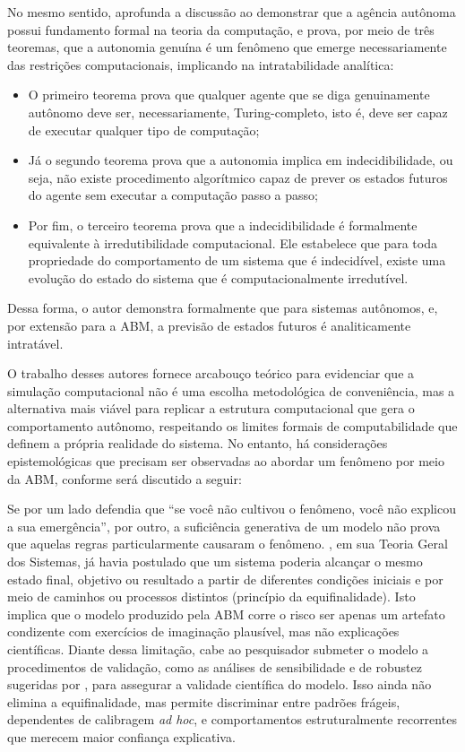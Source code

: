 \documentclass[12pt,oneside,a4paper,brazil,sumario=tradicional]{abntex2}
\begin{document}
No mesmo sentido,  aprofunda a discussão ao demonstrar que a agência autônoma possui fundamento formal na teoria da computação, e prova, por meio de três teoremas, que a autonomia genuína é um fenômeno que emerge necessariamente das restrições computacionais, implicando na intratabilidade analítica:

\begin{itemize}
  \item O primeiro teorema prova que qualquer agente que se diga genuinamente autônomo deve ser, necessariamente, Turing-completo, isto é, deve ser capaz de executar qualquer tipo de computação;
  \item Já o segundo teorema prova que a autonomia implica em indecidibilidade, ou seja, não existe procedimento algorítmico capaz de prever os estados futuros do agente sem executar a computação passo a passo;
  \item Por fim, o terceiro teorema prova que a indecidibilidade é formalmente equivalente à irredutibilidade computacional. Ele estabelece que para toda propriedade do comportamento de um sistema que é indecidível, existe uma evolução do estado do sistema que é computacionalmente irredutível.
\end{itemize}
Dessa forma, o autor demonstra formalmente que para sistemas autônomos, e, por extensão para a ABM, a previsão de estados futuros é analiticamente intratável.

O trabalho desses autores fornece arcabouço teórico para evidenciar que a simulação computacional não é uma escolha metodológica de conveniência, mas a alternativa mais viável para replicar a estrutura computacional que gera o comportamento autônomo, respeitando os limites formais de computabilidade que definem a própria realidade do sistema. No entanto, há considerações epistemológicas que precisam ser observadas ao abordar um fenômeno por meio da ABM, conforme será discutido a seguir:

Se por um lado  defendia que “se você não cultivou o fenômeno, você não explicou a sua emergência”, por outro, a suficiência generativa de um modelo não prova que aquelas regras particularmente causaram o fenômeno. , em sua Teoria Geral dos Sistemas, já havia postulado que um sistema poderia alcançar o mesmo estado final, objetivo ou resultado a partir de diferentes condições iniciais e por meio de caminhos ou processos distintos (princípio da equifinalidade). Isto implica que o modelo produzido pela ABM corre o risco ser apenas um artefato condizente com exercícios de imaginação plausível, mas não explicações científicas. Diante dessa limitação, cabe ao pesquisador submeter o modelo a procedimentos de validação, como as análises de sensibilidade e de robustez sugeridas por , para assegurar a validade científica do modelo. Isso ainda não elimina a equifinalidade, mas permite discriminar entre padrões frágeis, dependentes de calibragem \textit{ad hoc}, e comportamentos estruturalmente recorrentes que merecem maior confiança explicativa.
\end{document}
